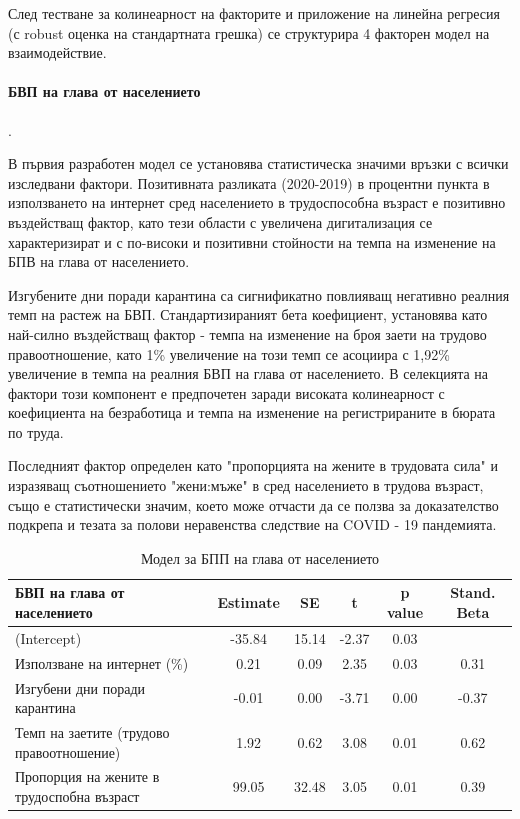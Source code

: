 \documentclass[a4paper,12pt]{article}
\begin{document}
След тестване за колинеарност на факторите и приложение на линейна регресия (с robust оценка на стандартната грешка) се структурира 4 факторен модел на взаимодействие. 

\paragraph{БВП на глава от населението}.

В първия разработен модел се установява статистическа значими връзки с всички изследвани фактори. Позитивната разликата (2020-2019) в процентни пункта в използването на интернет сред населението в трудоспособна възраст е позитивно въздействащ фактор, като тези области с увеличена дигитализация се характеризират и с по-високи и позитивни стойности на темпа на изменение на БПВ на глава от населението. 

Изгубените дни поради карантина са сигнификатно повлияващ негативно реалния темп на растеж на БВП. Стандартизираният бета коефициент, установява като най-силно въздействащ фактор - темпа на изменение на броя заети на трудово правоотношение, като 1\% увеличение на този темп се асоциира с 1,92\% увеличение в темпа на реалния БВП на глава от населението. В селекцията на фактори този компонент е предпочетен заради високата колинеарност с коефициента на безработица и темпа на изменение на регистрираните в бюрата по труда.

Последният фактор определен като "пропорцията на жените в трудовата сила" и изразяващ съотношението "жени:мъже" в сред населението в трудова възраст, също е статистически значим, което може отчасти да се ползва за доказателство подкрепа и тезата за полови неравенства следствие на COVID - 19 пандемията. \cite{NBERw26947}


\begin{table}[H]
	\centering
	\caption{Модел за БПП на глава от населението}
	\begin{tabular}{lccccc}
		\toprule
		БВП на глава от населението  & Estimate & SE    & t     & p value & Stand. Beta \\
		\midrule
		(Intercept) & -35.84 & 15.14 & -2.37 & 0.03  &  \\
		Използване на интернет (\%) & 0.21  & 0.09  & 2.35  & 0.03  & 0.31 \\
		Изгубени дни поради карантина  & -0.01 & 0.00  & -3.71 & 0.00  & -0.37 \\
		Темп на заетите (трудово правоотношение) & 1.92  & 0.62  & 3.08  & 0.01  & 0.62 \\
		Пропорция на жените в трудоспобна възраст  & 99.05 & 32.48 & 3.05  & 0.01  & 0.39 \\
		\bottomrule
	\end{tabular}%
	\label{tab:addlabel}%
\end{table}%
\end{document}
